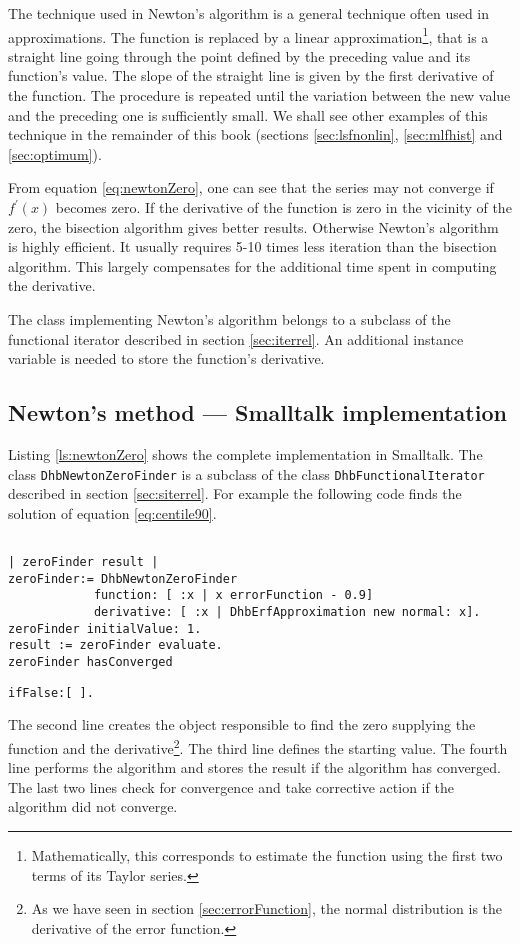 \documentclass[twoside]{book}
\begin{document}
The technique used in Newton's algorithm is a general technique
often used in approximations. The function is replaced by a linear
approximation\footnote{Mathematically, this corresponds to
estimate the function using the first two terms of its Taylor
series.}, that is a straight line going through the point defined
by the preceding value and its function's value. The slope of the
straight line is given by the first derivative of the function.
The procedure is repeated until the variation between the new
value and the preceding one is sufficiently small. We shall see
other examples of this technique in the remainder of this book
(\cf sections \ref{sec:lsfnonlin}, \ref{sec:mlfhist} and
\ref{sec:optimum}).

From equation \ref{eq:newtonZero}, one can see that the series may
not converge if $f^{\prime}\left(x\right)$ becomes zero. If the
derivative of the function is zero in the vicinity of the zero,
the bisection algorithm gives better results. Otherwise Newton's
algorithm is highly efficient. It usually requires 5-10 times less
iteration than the bisection algorithm. This largely compensates
for the additional time spent in computing the derivative.

The class implementing Newton's algorithm belongs to a subclass of
the functional iterator described in section \ref{sec:iterrel}. An
additional instance variable is needed to store the function's
derivative.

\subsection{Newton's method --- Smalltalk implementation}
\label{sec:snewton} Listing \ref{ls:newtonZero} shows the complete
implementation in Smalltalk. The class {\tt DhbNewtonZeroFinder}
is a subclass of the class {\tt DhbFunctionalIterator} described
in section \ref{sec:siterrel}. For example the following code
finds the solution of equation \ref{eq:centile90}.
\begin{codeExample}
\begin{verbatim}

| zeroFinder result |
zeroFinder:= DhbNewtonZeroFinder
            function: [ :x | x errorFunction - 0.9]
            derivative: [ :x | DhbErfApproximation new normal: x].
zeroFinder initialValue: 1.
result := zeroFinder evaluate.
zeroFinder hasConverged
\end{verbatim}
    {\tt ifFalse:[ {\sl <special case processing>}].}
\end{codeExample}
The second line creates the object responsible to find the zero
supplying the function and the derivative\footnote{As we have seen
in section \ref{sec:errorFunction}, the normal distribution is the
derivative of the error function.}. The third line defines the
starting value. The fourth line performs the algorithm and stores
the result if the algorithm has converged. The last two lines
check for convergence and take corrective action if the algorithm
did not converge.
\end{document}
